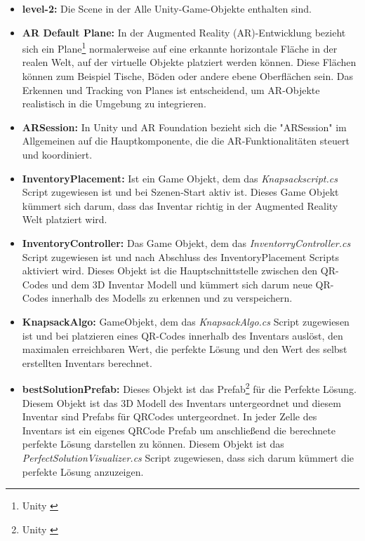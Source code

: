 \begin{itemize}
    \item \textbf{level-2:} Die Scene in der Alle Unity-Game-Objekte enthalten sind.
    \item \textbf{AR Default Plane:} In der Augmented Reality (AR)-Entwicklung bezieht sich ein Plane\footnote{Unity \cite{Plane}} normalerweise
    auf eine erkannte horizontale Fläche in der realen Welt, auf der virtuelle Objekte platziert werden können. Diese
    Flächen können zum Beispiel Tische, Böden oder andere ebene Oberflächen sein. Das Erkennen und Tracking von Planes
    ist entscheidend, um AR-Objekte realistisch in die Umgebung zu integrieren.
    \item \textbf{ARSession:} In Unity und AR Foundation bezieht sich die "ARSession" im Allgemeinen auf die
    Hauptkomponente, die die AR-Funktionalitäten steuert und koordiniert.
    \item \textbf{InventoryPlacement:} Ist ein Game Objekt, dem das \textit{Knapsackscript.cs} Script zugewiesen ist und
    bei Szenen-Start aktiv ist. Dieses Game Objekt kümmert sich darum, dass das Inventar richtig in der Augmented Reality
    Welt platziert wird.
    \item \textbf{InventoryController:} Das Game Objekt, dem das \textit{InventorryController.cs} Script zugewiesen ist
    und nach Abschluss des InventoryPlacement Scripts aktiviert wird. Dieses Objekt ist die Hauptschnittstelle
    zwischen den QR-Codes und dem 3D Inventar Modell und kümmert sich darum neue QR-Codes innerhalb des Modells zu erkennen
    und zu verspeichern.
    \item \textbf{KnapsackAlgo:} GameObjekt, dem das \textit{KnapsackAlgo.cs} Script zugewiesen ist und bei platzieren
    eines QR-Codes innerhalb des Inventars auslöst, den maximalen erreichbaren Wert, die perfekte Lösung und den Wert des
    selbst erstellten Inventars berechnet.
    \item \textbf{bestSolutionPrefab:} Dieses Objekt ist das Prefab\footnote{Unity \cite{Prefab}} für die Perfekte Lösung.
    Diesem Objekt ist das 3D Modell des Inventars untergeordnet und diesem Inventar sind Prefabs für QRCodes untergeordnet.
    In jeder Zelle des Inventars ist ein eigenes QRCode Prefab um anschließend die berechnete perfekte Lösung darstellen zu können.
    Diesem Objekt ist das \textit{PerfectSolutionVisualizer.cs} Script zugewiesen, dass sich darum kümmert die perfekte Lösung
    anzuzeigen.
    \begin{figure}[h]
        \centering

\end{figure}
\end{itemize}
